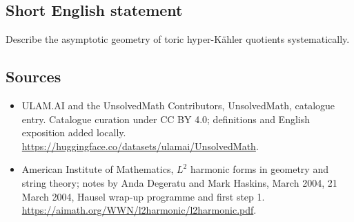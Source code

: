 \documentclass[11pt]{article}
\begin{document}
\subsection{Short English statement}
Describe the asymptotic geometry of toric hyper-Kähler quotients systematically.
\subsection{Sources}
\begin{itemize}
\item[\hypertarget{source:statement:1}{S1}] ULAM.AI and the UnsolvedMath Contributors, UnsolvedMath, catalogue entry. Catalogue curation under CC BY 4.0; definitions and English exposition added locally.
\url{https://huggingface.co/datasets/ulamai/UnsolvedMath}.
\item[\hypertarget{source:statement:2}{S2}] American Institute of Mathematics, $L^2$ harmonic forms in geometry and string theory; notes by Anda Degeratu and Mark Haskins, March 2004, 21 March 2004, Hausel wrap-up programme and first step 1.
\url{https://aimath.org/WWN/l2harmonic/l2harmonic.pdf}.
\end{itemize}
\label{end:statement}
\end{document}
